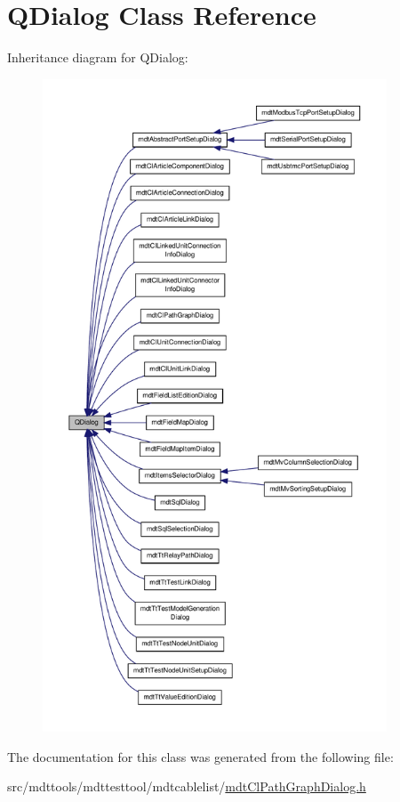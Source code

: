 \hypertarget{class_q_dialog}{\section{Q\-Dialog Class Reference}
\label{class_q_dialog}
}


Inheritance diagram for Q\-Dialog\-:\nopagebreak
\begin{figure}[H]
\begin{center}
\leavevmode
\includegraphics[height=550pt]{class_q_dialog__inherit__graph}
\end{center}
\end{figure}


The documentation for this class was generated from the following file\-:\begin{DoxyCompactItemize}
\item 
src/mdttools/mdttesttool/mdtcablelist/\hyperlink{mdt_cl_path_graph_dialog_8h}{mdt\-Cl\-Path\-Graph\-Dialog.\-h}\end{DoxyCompactItemize}
